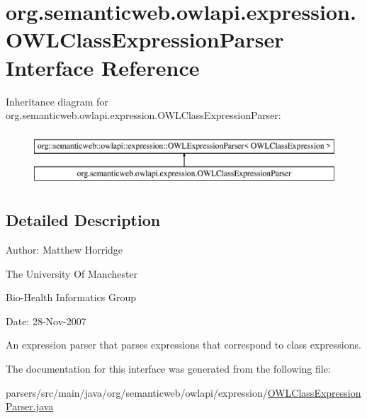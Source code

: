 \hypertarget{interfaceorg_1_1semanticweb_1_1owlapi_1_1expression_1_1_o_w_l_class_expression_parser}{\section{org.\-semanticweb.\-owlapi.\-expression.\-O\-W\-L\-Class\-Expression\-Parser Interface Reference}
\label{interfaceorg_1_1semanticweb_1_1owlapi_1_1expression_1_1_o_w_l_class_expression_parser}
}
Inheritance diagram for org.\-semanticweb.\-owlapi.\-expression.\-O\-W\-L\-Class\-Expression\-Parser\-:\begin{figure}[H]
\begin{center}
\leavevmode
\includegraphics[height=2.000000cm]{interfaceorg_1_1semanticweb_1_1owlapi_1_1expression_1_1_o_w_l_class_expression_parser}
\end{center}
\end{figure}


\subsection{Detailed Description}
Author\-: Matthew Horridge\par
 The University Of Manchester\par
 Bio-\/\-Health Informatics Group\par
 Date\-: 28-\/\-Nov-\/2007\par
\par


An expression parser that parses expressions that correspond to class expressions. 

The documentation for this interface was generated from the following file\-:\begin{DoxyCompactItemize}
\item 
parsers/src/main/java/org/semanticweb/owlapi/expression/\hyperlink{_o_w_l_class_expression_parser_8java}{O\-W\-L\-Class\-Expression\-Parser.\-java}\end{DoxyCompactItemize}
